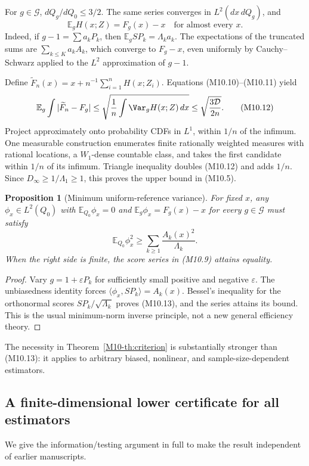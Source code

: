 \documentclass[11pt,a4paper]{article}
\newtheorem{proposition}[theorem]{Proposition}
\theoremstyle{definition}\newtheorem{definition}[theorem]{Definition}
\theoremstyle{remark}\newtheorem{remark}[theorem]{Remark}
\newcommand{\E}{\mathbb E}\newcommand{\one}{\mathbf 1}\newcommand{\1}{\mathbf 1}
\numberwithin{equation}{section}
\begin{document}
For $g\in\mathcal G$, $dQ_g/dQ_0\le3/2$. The same series converges in $L^2(dx\,dQ_g)$, and
\[
 \E_g H(x;Z)=F_g(x)-x\quad\text{for almost every }x.\tag{M10.11}
\]
Indeed, if $g-1=\sum a_kP_k$, then $\E_g SP_k=\Lambda_ka_k$. The expectations of the truncated sums are $\sum_{k\le K}a_kA_k$, which converge to $F_g-x$, even uniformly by Cauchy--Schwarz applied to the $L^2$ approximation of $g-1$.

Define $\widetilde F_n(x)=x+n^{-1}\sum_{i=1}^nH(x;Z_i)$. Equations (M10.10)--(M10.11) yield
\[
 \E_g\int|\widetilde F_n-F_g|
 \le\sqrt{\frac1n\int\Var_g H(x;Z)\,dx}
 \le\sqrt{\frac{3\mathcal D}{2n}}.\tag{M10.12}
\]
Project approximately onto probability CDFs in $L^1$, within $1/n$ of the infimum. One measurable construction enumerates finite rationally weighted measures with rational locations, a $W_1$-dense countable class, and takes the first candidate within $1/n$ of its infimum. Triangle inequality doubles (M10.12) and adds $1/n$. Since $D_\infty\ge1/\Lambda_1\ge1$, this proves the upper bound in (M10.5).

\begin{proposition}[Minimum uniform-reference variance]
For fixed $x$, any $\phi_x\in L^2(Q_0)$ with $\E_{Q_0}\phi_x=0$ and
$\E_g\phi_x=F_g(x)-x$ for every $g\in\mathcal G$ must satisfy
\[
 \E_{Q_0}\phi_x^2\ge\sum_{k\ge1}\frac{A_k(x)^2}{\Lambda_k}.\tag{M10.13}
\]
When the right side is finite, the score series in (M10.9) attains equality.
\end{proposition}
\begin{proof}
Vary $g=1+\varepsilon P_k$ for sufficiently small positive and negative $\varepsilon$. The unbiasedness identity forces $\langle\phi_x,SP_k\rangle=A_k(x)$. Bessel's inequality for the orthonormal scores $SP_k/\sqrt{\Lambda_k}$ proves (M10.13), and the series attains its bound. This is the usual minimum-norm inverse principle, not a new general efficiency theory.
\end{proof}
The necessity in Theorem~\ref{M10-th:criterion} is substantially stronger than (M10.13): it applies to arbitrary biased, nonlinear, and sample-size-dependent estimators.

\subsection{A finite-dimensional lower certificate for all estimators}\label{M10-sec-4}
We give the information/testing argument in full to make the result independent of earlier manuscripts.
\end{document}
